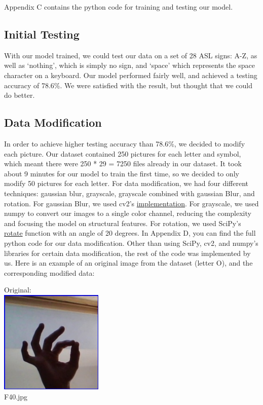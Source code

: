\documentclass[10pt,twocolumn,letterpaper]{article}
\begin{document}
Appendix C contains the python code for training and testing our model.

\subsection{Initial Testing}
With our model trained, we could test our data on a set of 28 ASL signs: A-Z, 
as well as ‘nothing’, which is simply no sign, and ‘space’ which represents 
the space character on a keyboard. Our model performed fairly well, and achieved
a testing accuracy of 78.6\%. We were satisfied with the result, but thought that we could do better.

\subsection{Data Modification}
In order to achieve higher testing accuracy than 78.6\%, we decided to modify 
each picture. Our dataset contained 250 pictures for each letter and symbol,
which meant there were 250 * 29 = 7250 files already in our dataset. It took
about 9 minutes for our model to train the first time, so we decided to only
modify 50 pictures for each letter. For data modification, we had four different
techniques: gaussian blur, grayscale, grayscale combined with gaussian Blur,
and rotation. For gaussian Blur, we used cv2’s
\href{https://docs.opencv.org/4.x/d4/d86/group__imgproc__filter.html#gaabe8c836e97159a9193fb0b11ac52cf1}{implementation}.
For grayscale, we used numpy to convert our images to a single color channel,
reducing the complexity and focusing the model on structural features. 
For rotation, we used SciPy’s
\href{https://docs.scipy.org/doc/scipy/reference/generated/scipy.ndimage.rotate.html}{rotate}
function with an angle of 20 degrees. In Appendix D, you can find the
full python code for our data modification. 
Other than using SciPy, cv2, and numpy’s libraries for certain data 
modification, the rest of the code was implemented by us. Here is an example
of an original image from the dataset (letter O), and the corresponding modified data:
\begin{center}
    Original: \\\includegraphics[width=0.37\textwidth]{../asl_alphabet_modified/F/F40.jpg}\\F40.jpg
\end{center}
\end{document}
